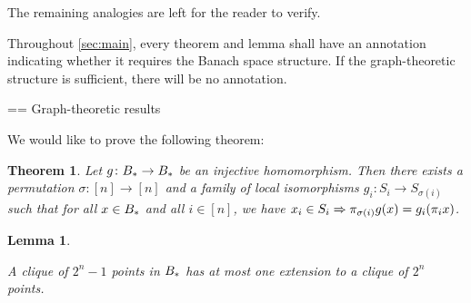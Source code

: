 \documentclass{amsart}
\newtheorem{theorem}{Theorem}[section]
\newtheorem{lemma}{Lemma}[section]
\theoremstyle{definition}
\begin{document}
The remaining analogies are left for the reader to verify.

Throughout \autoref{sec:main}, every theorem and lemma shall have an annotation indicating whether it requires the Banach space structure. If the graph-theoretic structure is sufficient, there will be no annotation.

== Graph-theoretic results

We would like to prove the following theorem:

\begin{theorem} \label{thm:factors}
Let $g  \colon  B_* \to B_*$ be an injective homomorphism. Then there exists a permutation $\sigma \colon  [n]\to[n]$ and a family of local isomorphisms $g_i  \colon  S_i \to S_{\sigma(i)}$ such that for all $x \in B_*$ and all $i \in [n]$, we have $x_i \in S_i \Rightarrow \pi_{\sigma(i)}g(x) = g_i (\pi_i x)$.\end{theorem}

\begin{lemma} \label{lem:clique-ext}

  A clique of $2^n-1$ points in $B_*$ has at most one extension
to a clique of $2^n$ points.
\end{lemma}
\end{document}
